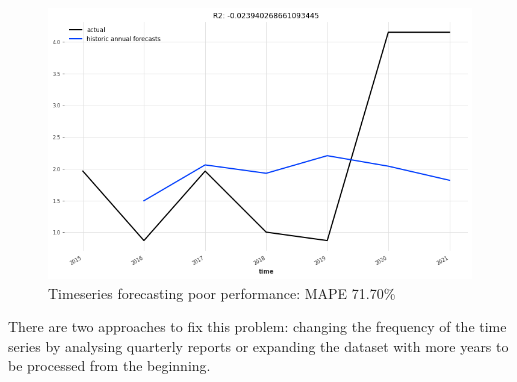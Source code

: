\documentclass[12pt,MSc,a4paper,oneside]{muthesis}
\begin{document}
\begin{figure}[h]
    \centering
    \includegraphics[scale=0.3]{timeseries_went_wrong.png}
    \caption{Timeseries forecasting poor performance: MAPE 71.70\%}
\end{figure}

	 
There are two approaches to fix this problem: changing the frequency of the time series by analysing quarterly reports or expanding the dataset with more years to be processed from the beginning.
\end{document}

